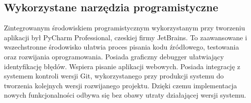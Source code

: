 \subsection{Wykorzystane narzędzia programistyczne}
Zintegrowanym środowiskiem programistycznym wykorzystanym przy tworzeniu aplikacji był PyCharm Professional, czeskiej firmy JetBrains. To zaawansowane i wszechstronne środowisko ułatwia proces pisania kodu źródłowego, testowania oraz rozwijania oprogramowania. Posiada graficzny debugger ułatwiający identyfikację błędów. Wspiera pisanie aplikacji webowych. Posiada integrację z systemem kontroli wersji Git, wykorzystanego przy produkcji systemu do tworzenia kolejnych wersji rozwijanego projektu. Dzięki czemu implementacja nowych funkcjonalności odbywa się bez obawy utraty działającej wersji systemu.
